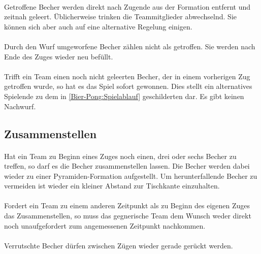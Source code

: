 \paragraph{}
Getroffene Becher werden direkt nach Zugende aus der Formation entfernt und zeitnah geleert.
Üblicherweise trinken die Teammitglieder abwechselnd.
Sie können sich aber auch auf eine alternative Regelung einigen.

\paragraph{}
Durch den Wurf umgeworfene Becher zählen nicht als getroffen.
Sie werden nach Ende des Zuges wieder neu befüllt.

\paragraph{}
Trifft ein Team einen noch nicht geleerten Becher, der in einem vorherigen Zug getroffen wurde, so hat es das Spiel sofort gewonnen.
Dies stellt ein alternatives Spielende zu dem in \ref{Bier-Pong:Spielablauf} geschilderten dar.
Es gibt keinen Nachwurf.


\subsection{Zusammenstellen}
\paragraph{}
Hat ein Team zu Beginn eines Zuges noch einen, drei oder sechs Becher zu treffen, so darf es die Becher zusammenstellen lassen.
Die Becher werden dabei wieder zu einer Pyramiden-Formation aufgestellt.
Um herunterfallende Becher zu vermeiden ist wieder ein kleiner Abstand zur Tischkante einzuhalten.

\paragraph{}
Fordert ein Team zu einem anderen Zeitpunkt als zu Beginn des eigenen Zuges das Zusammenstellen, so muss das gegnerische Team dem Wunsch weder direkt noch unaufgefordert zum angemessenen Zeitpunkt nachkommen.

\paragraph{}
Verrutschte Becher dürfen zwischen Zügen wieder gerade gerückt werden.

